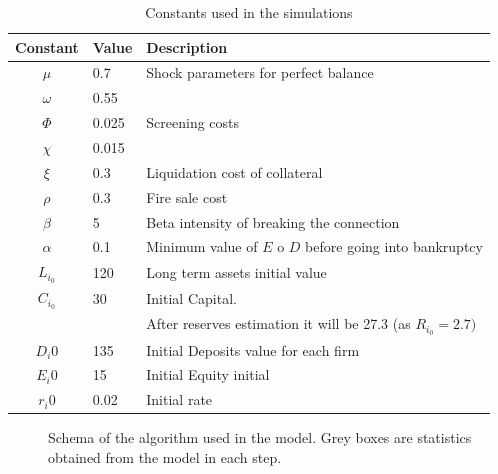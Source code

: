 \documentclass{article}
\begin{document}
\begin{table}[h!]
\centering
\caption{Constants used in the simulations}
\begin{tabular}{cll}
\hline
\textbf{Constant} & \textbf{Value} & \textbf{Description} \\ 
\hline
$\mu$ & 0.7 & Shock parameters for perfect balance \\
$\omega$ & 0.55 &  \\
$\Phi$ & 0.025 & Screening costs \\
$\chi$ & 0.015 &  \\
$\xi$ & 0.3 & Liquidation cost of collateral \\
$\rho$ & 0.3 &  Fire sale cost \\
$\beta$ & 5 & Beta intensity of breaking the connection\\
$\alpha$ & 0.1 & Minimum value of  $E$ o $D$ before going into bankruptcy\\
$L_{i_0}$ &120  & Long term assets initial value \\
$C_{i_0}$ & 30  & Initial Capital.\\
& &  After reserves estimation it will be 27.3 (as $R_{i_0}=2.7)$\\
$D_i0$ & 135 & Initial Deposits value for each firm \\
$E_i0$ & 15  & Initial Equity initial\\
$r_i0$ & 0.02 & Initial rate \\
\hline
\end{tabular}
\end{table}

\newpage

\begin{figure}
\vspace{-3cm}
  \caption{Schema of the algorithm used in the model. Grey boxes are statistics obtained from the model in each step.}
  \label{fig:algorithm_figure}


\end{figure}
\;
\newpage




\end{document}
